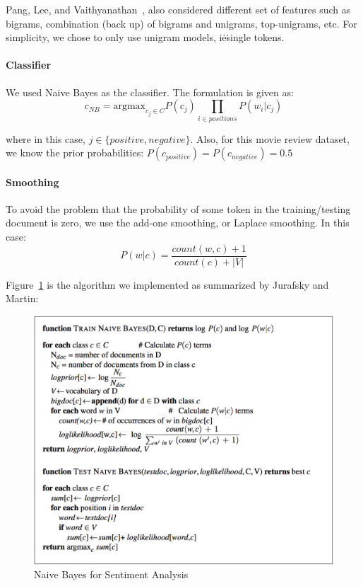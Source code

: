 Pang, Lee, and
Vaithyanathan~\cite{hid-sp18-405-sentiment-pang2002thumbs}, also
considered different set of features such as bigrams, combination
(back up) of bigrams and unigrams, top-unigrams, etc. For simplicity,
we chose to only use unigram models, i\.e\. single tokens.

\paragraph{Classifier}
We used Naive Bayes as the classifier. The formulation is given as:
\begin{equation}\label{eq:nb}
c_{NB}=\text{argmax}_{c_j \in C} P(c_j) \prod_{i \in positions} P(w_i|c_j)
\end{equation}

where in this case, $j \in \{positive, negative\}$. Also, for this
movie review dataset, we know the prior probabilities:
$P(c_{positive})=P(c_{negative})=0.5$

\paragraph{Smoothing}
To avoid the problem that the probability of some token in the 
training/testing document is zero, we use the add-one smoothing, or Laplace 
smoothing. In this case:
\begin{equation}\label{eq:sm}
P(w|c) = \frac{count(w,c) + 1}{count(c) + |V|}
\end{equation}

Figure~\ref{f:algo} is the algorithm we implemented as summarized by
Jurafsky and Martin:
\begin{figure}[!ht]
		\centering\includegraphics[width=\columnwidth]{images/algorithm.png}
		\caption{Naive Bayes for Sentiment 
		Analysis~\cite{hid-sp18-405-sentiment-jurafsky2009}}\label{f:algo}
\end{figure}

